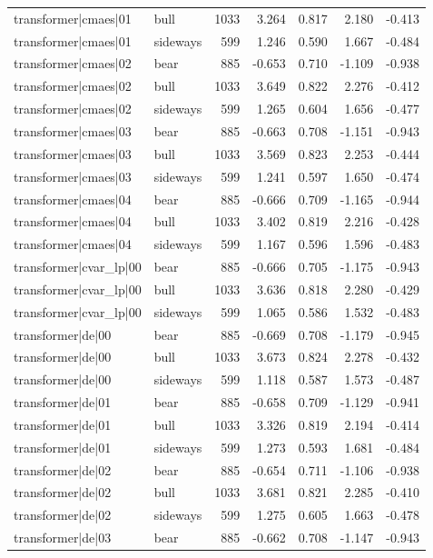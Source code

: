 \begin{table}
\begin{tabular}{llrrrrr}
transformer|cmaes|01 & bull & 1033 & 3.264 & 0.817 & 2.180 & -0.413 \\
transformer|cmaes|01 & sideways & 599 & 1.246 & 0.590 & 1.667 & -0.484 \\
transformer|cmaes|02 & bear & 885 & -0.653 & 0.710 & -1.109 & -0.938 \\
transformer|cmaes|02 & bull & 1033 & 3.649 & 0.822 & 2.276 & -0.412 \\
transformer|cmaes|02 & sideways & 599 & 1.265 & 0.604 & 1.656 & -0.477 \\
transformer|cmaes|03 & bear & 885 & -0.663 & 0.708 & -1.151 & -0.943 \\
transformer|cmaes|03 & bull & 1033 & 3.569 & 0.823 & 2.253 & -0.444 \\
transformer|cmaes|03 & sideways & 599 & 1.241 & 0.597 & 1.650 & -0.474 \\
transformer|cmaes|04 & bear & 885 & -0.666 & 0.709 & -1.165 & -0.944 \\
transformer|cmaes|04 & bull & 1033 & 3.402 & 0.819 & 2.216 & -0.428 \\
transformer|cmaes|04 & sideways & 599 & 1.167 & 0.596 & 1.596 & -0.483 \\
transformer|cvar\_lp|00 & bear & 885 & -0.666 & 0.705 & -1.175 & -0.943 \\
transformer|cvar\_lp|00 & bull & 1033 & 3.636 & 0.818 & 2.280 & -0.429 \\
transformer|cvar\_lp|00 & sideways & 599 & 1.065 & 0.586 & 1.532 & -0.483 \\
transformer|de|00 & bear & 885 & -0.669 & 0.708 & -1.179 & -0.945 \\
transformer|de|00 & bull & 1033 & 3.673 & 0.824 & 2.278 & -0.432 \\
transformer|de|00 & sideways & 599 & 1.118 & 0.587 & 1.573 & -0.487 \\
transformer|de|01 & bear & 885 & -0.658 & 0.709 & -1.129 & -0.941 \\
transformer|de|01 & bull & 1033 & 3.326 & 0.819 & 2.194 & -0.414 \\
transformer|de|01 & sideways & 599 & 1.273 & 0.593 & 1.681 & -0.484 \\
transformer|de|02 & bear & 885 & -0.654 & 0.711 & -1.106 & -0.938 \\
transformer|de|02 & bull & 1033 & 3.681 & 0.821 & 2.285 & -0.410 \\
transformer|de|02 & sideways & 599 & 1.275 & 0.605 & 1.663 & -0.478 \\
transformer|de|03 & bear & 885 & -0.662 & 0.708 & -1.147 & -0.943 \\

\end{tabular}
\end{table}
